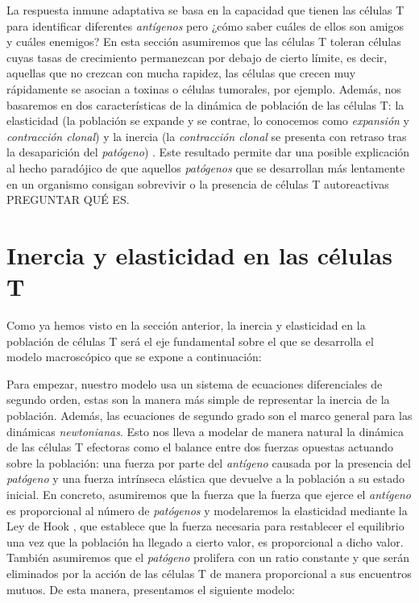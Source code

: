 La respuesta inmune adaptativa se basa en la capacidad que tienen las células T para identificar diferentes \textit{antígenos} pero ¿cómo saber cuáles de ellos son amigos y cuáles enemigos? En esta sección asumiremos que las células T toleran células cuyas tasas de crecimiento permanezcan por debajo de cierto límite, es decir, aquellas que no crezcan con mucha rapidez, las células que crecen muy rápidamente se asocian a toxinas o células tumorales, por ejemplo. Además, nos basaremos en dos características de la dinámica de población de las células T: la elasticidad (la población se expande y se contrae, lo conocemos como \textit{expansión} y \textit{contracción clonal}) y la inercia (la \textit{contracción clonal} se presenta con retraso tras la desaparición del \textit{patógeno}) \citep{arias2015growth}. Este resultado permite dar una posible explicación al hecho paradójico de que aquellos \textit{patógenos} que se desarrollan más lentamente en un organismo consigan sobrevivir o la presencia de células T autoreactivas PREGUNTAR QUÉ ES.


\section{Inercia y elasticidad en las células T}

Como ya hemos visto en la sección anterior, la inercia y elasticidad en la población de células T será el eje fundamental sobre el que se desarrolla el modelo macroscópico que se expone a continuación: 

Para empezar, nuestro modelo usa un sistema de ecuaciones diferenciales de segundo orden, estas son la manera más simple de representar la inercia de la población. Además, las ecuaciones de segundo grado son el marco general para las dinámicas \textit{newtonianas}. Esto nos lleva a modelar de manera natural la dinámica de las células T efectoras como el balance entre dos fuerzas opuestas actuando sobre la población: una fuerza por parte del \textit{antígeno} causada por la presencia del \textit{patógeno} y una fuerza intrínseca elástica que devuelve a la población a su estado inicial. En concreto, asumiremos que la fuerza que la fuerza que ejerce el \textit{antígeno} es proporcional al número de \textit{patógenos} y modelaremos la elasticidad mediante la Ley de Hook \citep{arias2015growth}, que establece que la fuerza necesaria para restablecer el equilibrio una vez que la población ha llegado a cierto valor, es proporcional a dicho valor. También asumiremos que el \textit{patógeno} prolifera con un ratio constante y que serán eliminados por la acción de las células T de manera proporcional a sus encuentros mutuos. De esta manera, presentamos el siguiente modelo:


